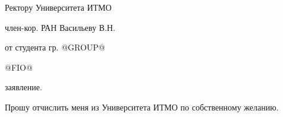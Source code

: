 \documentclass[a4paper]{article}
\begin{document}
\LARGE
\raggedleft
 Ректору Университета ИТМО


\raggedleft
 член-кор. РАН
Васильеву В.Н.


от студента гр. @GROUP@


\vspace{0.3cm}

@FIO@

\centering
\vspace{5cm}

{{заявление.}}
\vspace{1cm}

\qquad\raggedright
Прошу отчислить меня
 из Университета \LARGE{ИТМО} по собственному желанию.

\vspace{5cm}

\centering\qquad\qquad\qquad\qquad\qquad\qquad\qquad\qquad { {\today}} \\
\vspace{0.3cm}
\centering\qquad\qquad\qquad\qquad\qquad\qquad\qquad\qquad {\_}{\_}{\_}{\_}{\_}{\_}{\_}{\_} \\
\end{document}
